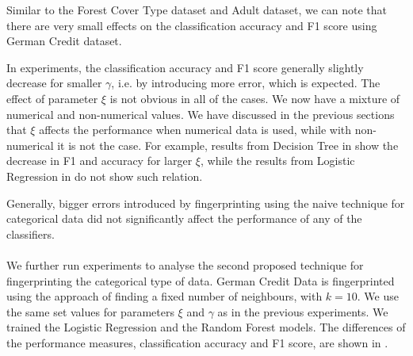 Similar to the Forest Cover Type dataset and Adult dataset, we can note that there are very small effects on the classification accuracy and F1 score using German Credit dataset. 

In experiments, the classification accuracy and F1 score generally slightly decrease for smaller $\gamma$, i.e. by introducing more error, which is expected. 
The effect of parameter $\xi$ is not obvious in all of the cases. We now have a mixture of numerical and non-numerical values. We have discussed in the previous sections that $\xi$ affects the performance when numerical data is used, while with non-numerical it is not the case. 
For example, results from Decision Tree in  show the decrease in F1 and accuracy for larger $\xi$, while the results from Logistic Regression in  do not show such relation.

Generally, bigger errors introduced by fingerprinting using the naive technique for categorical data did not significantly affect the performance of any of the classifiers. 

\paragraph{}
We further run experiments to analyse the second proposed technique for fingerprinting the categorical type of data. 
German Credit Data is fingerprinted using the approach of finding a fixed number of neighbours, with $k=10$. 
We use the same set values for parameters $\xi$ and $\gamma$ as in the previous experiments. 
We trained the Logistic Regression and the Random Forest models. The differences of the performance measures, classification accuracy and F1 score, are shown in .


